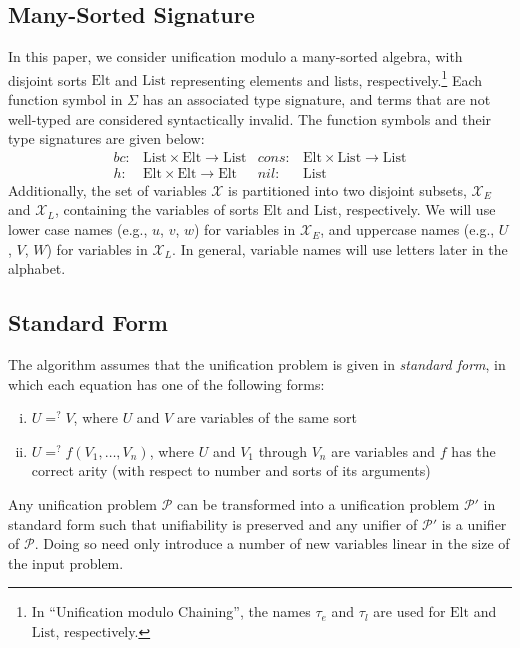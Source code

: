 \documentclass[11pt]{article}
\newcommand{\ueq}{=_{}^?}
\newcommand{\X}{\mathcal{X}}
\newcommand{\p}{\mathcal{P}}
\newcommand{\Elt}{\mathrm{Elt}}
\newcommand{\List}{\mathrm{List}}
\newcommand{\Bc}{\mathit{bc}}
\newcommand{\Hh}{\mathit{h}}
\newcommand{\Cons}{\mathit{cons}}
\newcommand{\Nil}{\mathit{nil}}
\begin{document}
\subsection{Many-Sorted Signature}\label{subsection:signature}

In this paper, we consider unification modulo a many-sorted algebra, with
disjoint sorts $\Elt$ and $\List$ representing elements and lists,
respectively.\footnote{In ``Unification modulo Chaining'', the names $\tau_e$
and $\tau_l$ are used for $\Elt$ and $\List$, respectively.} Each function
symbol in $\Sigma$ has an associated type signature, and terms that are not
well-typed are considered syntactically invalid. The function symbols and their
type signatures are given below:
\begin{align*}
    \Bc \colon &\List \times \Elt \to \List &
    \Cons \colon &\Elt \times \List \to \List \\
    \Hh \colon &\Elt \times \Elt \to \Elt &
    \Nil \colon &\List
\end{align*}
Additionally, the set of variables $\X$ is partitioned into two disjoint subsets,
$\X_E$ and $\X_L$, containing the variables of sorts $\Elt$ and $\List$, respectively.
We will use lower case names (e.g., $u$, $v$, $w$) for variables in $\X_E$, and
uppercase names (e.g., $U$, $V$, $W$) for variables in $\X_L$. In general, variable
names will use letters later in the alphabet.

\subsection{Standard Form}\label{subsection:standard-form}

The algorithm assumes that the unification problem is given in \emph{standard form},
in which each equation has one of the following forms:
\begin{enumerate}[(i)]
    \item $U \ueq V$, where $U$ and $V$ are variables of the same sort
    \item $U \ueq f(V_1, \dotsc, V_n)$, where $U$ and $V_1$ through $V_n$ are
        variables and $f$ has the correct arity (with respect to number and sorts
        of its arguments)
\end{enumerate}
Any unification problem $\p$ can be transformed into a unification problem
$\p'$ in standard form such that unifiability is preserved and any unifier of
$\p'$ is a unifier of $\p$. Doing so need only introduce a number of new variables
linear in the size of the input problem.
\end{document}
